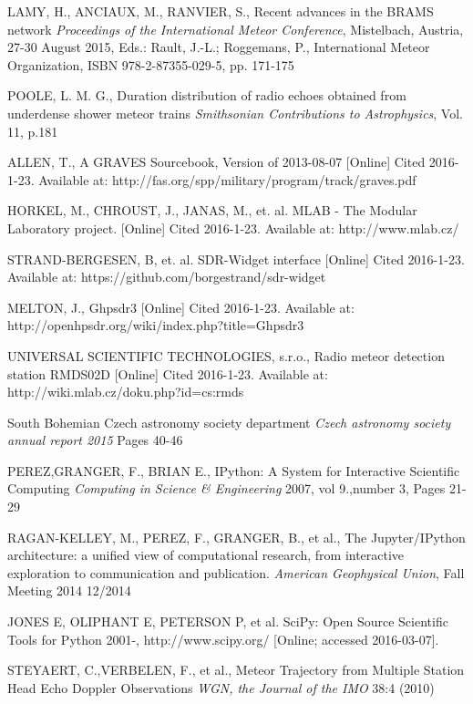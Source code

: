 \documentclass[twoside]{ctuthesis}
\theoremstyle{plain}
\theoremstyle{definition}
\theoremstyle{note}
\begin{document}
\begin{thebibliography}{99}
LAMY, H., ANCIAUX, M., RANVIER, S.,
Recent advances in the BRAMS network
\emph{Proceedings of the International Meteor Conference}, Mistelbach, Austria, 27-30 August 2015, Eds.: Rault, J.-L.; Roggemans, P., International Meteor Organization, ISBN 978-2-87355-029-5, pp. 171-175

POOLE, L. M. G.,
Duration distribution of radio echoes obtained from underdense shower meteor trains
\emph{Smithsonian Contributions to Astrophysics}, Vol. 11, p.181

ALLEN, T.,
A GRAVES Sourcebook, Version of 2013-08-07
[Online] Cited 2016-1-23. Available at: http://fas.org/spp/military/program/track/graves.pdf

HORKEL, M., CHROUST, J., JANAS, M., et. al. 
MLAB - The Modular Laboratory project.
[Online] Cited 2016-1-23. Available at: http://www.mlab.cz/

STRAND-BERGESEN, B, et. al.
SDR-Widget interface
[Online] Cited 2016-1-23. Available at: https://github.com/borgestrand/sdr-widget

MELTON, J.,
Ghpsdr3
[Online] Cited 2016-1-23. Available at: http://openhpsdr.org/wiki/index.php?title=Ghpsdr3

UNIVERSAL SCIENTIFIC TECHNOLOGIES, s.r.o.,  
Radio meteor detection station RMDS02D
[Online] Cited 2016-1-23. Available at: http://wiki.mlab.cz/doku.php?id=cs:rmds

South Bohemian Czech astronomy society department
\emph{Czech astronomy society annual report 2015}
Pages 40-46

PEREZ,GRANGER, F.,  BRIAN E.,
IPython: A System for Interactive Scientific Computing
\emph{Computing in Science \& Engineering}
2007, vol 9.,number 3,  Pages 21-29

RAGAN-KELLEY, M., PEREZ, F., GRANGER, B., et al.,
The Jupyter/IPython architecture: a unified view of computational research, from interactive exploration to communication and publication.
\emph{American Geophysical Union}, Fall Meeting 2014
12/2014

JONES E, OLIPHANT E, PETERSON P, et al.
SciPy: Open Source Scientific Tools for Python
2001-, http://www.scipy.org/ [Online; accessed 2016-03-07].

STEYAERT, C.,VERBELEN, F., et al.,
Meteor Trajectory from Multiple Station Head Echo Doppler Observations
\emph{WGN, the Journal of the IMO} 38:4 (2010)

\end{thebibliography}
\end{document}
